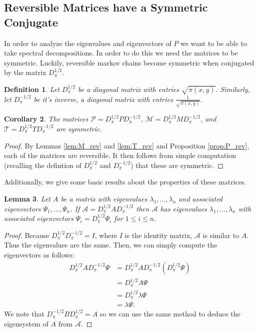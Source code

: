 \documentclass{amsart}
\newtheorem{definition}{Definition}[section]
\newtheorem{lemma}[definition]{Lemma}
\newtheorem{corollary}[definition]{Corollary}
\newcommand{\1}{\mathbbm{1}}
\newcommand{\D}{D_\pi^{1/2}}
\newcommand{\Dm}{D_\pi^{-1/2}}
\begin{document}
\subsection{Reversible Matrices have a Symmetric Conjugate}
In order to analyze the eigenvalues and eigenvectors of $P$ we want to be able to take spectral decompositions. In order to do this we need the matrices to be symmetric. Luckily, reversible markov chains become symmetric when conjugated by the matrix $\D$.

\begin{definition}
    Let $D_\pi^{1/2}$ be a diagonal matrix with entries $\sqrt{\pi(x,y)}$. Similarly, let $D_\pi^{-1/2}$ be it's inverse, a diagonal matrix with entries $\frac{1}{\sqrt{\pi(x,y)}}$. 
\end{definition}
\begin{corollary}\label{cor:sym}
    The matrices $\mathcal{P}=\D P\Dm$, $\mathcal{M}=\D M\Dm$, and $\mathcal{T}=\D T\Dm$ are symmetric.
\end{corollary}
\begin{proof}
    By Lemmas \ref{lem:M_rev} and \ref{lem:T_rev} and Proposition \ref{prop:P_rev}, each of the matrices are reversible. It then follows from simple computation (recalling the defintion of $\D$ and $\Dm$) that these are symmetric.
\end{proof}

Additionally, we give some basic results about the properties of these matrices.

\begin{lemma}\label{lem:D_eig}
    Let $A$ be a matrix with eigenvalues $\lambda_1,\dots,\lambda_n$ and associated eigenvectors $\Psi_{1},\dots,\Psi_{n}$. If $\mathcal{A}=\D A\Dm$ then $\mathcal{A}$ has eigenvalues $\lambda_1,\dots,\lambda_n$ with associated eigenvectors $\varPsi_i=\D\Psi_{i}$ for $1\leq i \leq n$.
\end{lemma}
\begin{proof}
    Because $\D\Dm=I$, where $I$ is the identity matrix, $\mathcal{A}$ is similar to $A$. Thus the eigenvalues are the same. Then, we can simply compute the eigenvectors as follows:
    \begin{align*}
        \D A\Dm \varPsi&=\D A\Dm \left(\D\Psi\right)\\
        &=\D A\Psi\\
        &=\D\lambda\Psi\\
        &=\lambda\varPsi.
    \end{align*}
    We note that $\Dm B\D=A$ so we can use the same method to deduce the eigensystem of $A$ from $\mathcal{A}$.
\end{proof}
\end{document}
